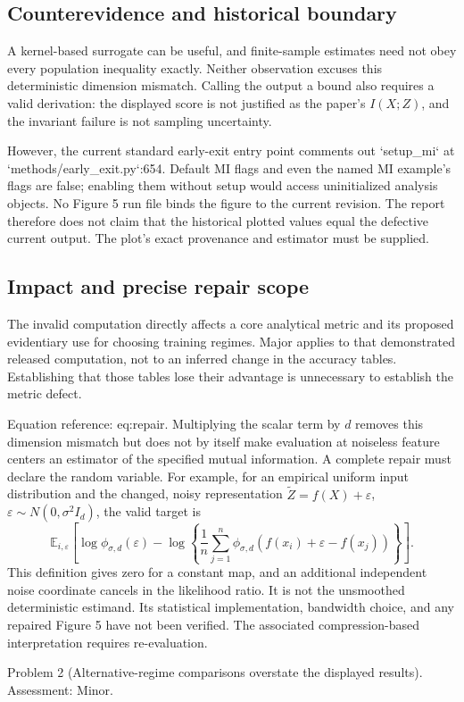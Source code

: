 \documentclass[10pt]{article}
\begin{document}
\subsection*{Counterevidence and historical boundary}
A kernel-based surrogate can be useful, and finite-sample estimates need not obey every population inequality exactly. Neither observation excuses this deterministic dimension mismatch. Calling the output a bound also requires a valid derivation: the displayed score is not justified as the paper’s \(I(X;Z)\), and the invariant failure is not sampling uncertainty.\par
However, the current standard early-exit entry point comments out `setup\_mi` at `methods/early\_exit.py`:654. Default MI flags and even the named MI example’s flags are false; enabling them without setup would access uninitialized analysis objects. No Figure 5 run file binds the figure to the current revision. The report therefore does not claim that the historical plotted values equal the defective current output. The plot’s exact provenance and estimator must be supplied.\par
\subsection*{Impact and precise repair scope}
The invalid computation directly affects a core analytical metric and its proposed evidentiary use for choosing training regimes. Major applies to that demonstrated released computation, not to an inferred change in the accuracy tables. Establishing that those tables lose their advantage is unnecessary to establish the metric defect.\par
Equation reference: eq:repair. Multiplying the scalar term by \(d\) removes this dimension mismatch but does not by itself make evaluation at noiseless feature centers an estimator of the specified mutual information. A complete repair must declare the random variable. For example, for an empirical uniform input distribution and the changed, noisy representation \(\widetilde Z=f(X)+\varepsilon\), \(\varepsilon\sim N(0,\sigma^2I_d)\), the valid target is \[
\mathbb E_{i,\varepsilon}\left[
\log\phi_{\sigma,d}(\varepsilon)-
\log\left\{\frac1n\sum_{j=1}^n
\phi_{\sigma,d}(f(x_i)+\varepsilon-f(x_j))\right\}\right].\] This definition gives zero for a constant map, and an additional independent noise coordinate cancels in the likelihood ratio. It is not the unsmoothed deterministic estimand. Its statistical implementation, bandwidth choice, and any repaired Figure 5 have not been verified. The associated compression-based interpretation requires re-evaluation.\par
Problem 2 (Alternative-regime comparisons overstate the displayed results).  Assessment: Minor.\par
\end{document}
